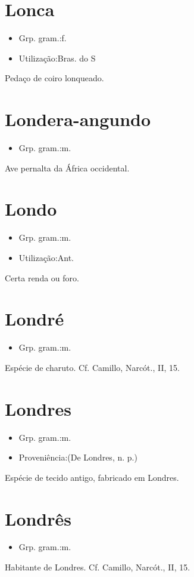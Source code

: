 \section{Lonca}
\begin{itemize}
\item {Grp. gram.:f.}
\end{itemize}
\begin{itemize}
\item {Utilização:Bras. do S}
\end{itemize}
Pedaço de coiro lonqueado.
\section{Londera-angundo}
\begin{itemize}
\item {Grp. gram.:m.}
\end{itemize}
Ave pernalta da África occidental.
\section{Londo}
\begin{itemize}
\item {Grp. gram.:m.}
\end{itemize}
\begin{itemize}
\item {Utilização:Ant.}
\end{itemize}
Certa renda ou foro.
\section{Londré}
\begin{itemize}
\item {Grp. gram.:m.}
\end{itemize}
Espécie de charuto. Cf. Camillo, Narcót., II, 15.
\section{Londres}
\begin{itemize}
\item {Grp. gram.:m.}
\end{itemize}
\begin{itemize}
\item {Proveniência:(De \textunderscore Londres\textunderscore , n. p.)}
\end{itemize}
Espécie de tecido antigo, fabricado em Londres.
\section{Londrês}
\begin{itemize}
\item {Grp. gram.:m.}
\end{itemize}
Habitante de Londres. Cf. Camillo, Narcót., II, 15.
